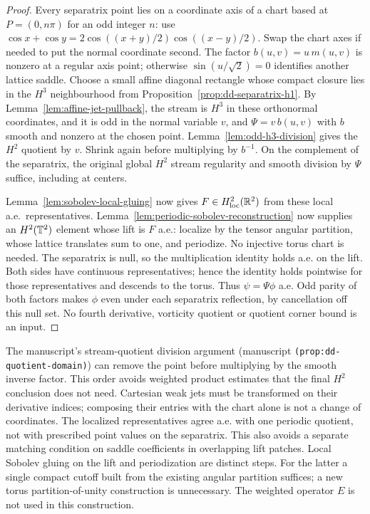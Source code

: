 \begin{proof}
Every separatrix point lies on a coordinate axis of a chart based at
$P=(0,n\pi)$ for an odd integer $n$: use
$\cos x+\cos y=2\cos((x+y)/2)\cos((x-y)/2)$.
Swap the chart axes if needed to put the normal coordinate second.
The factor $b(u,v)=u\,m(u,v)$ is nonzero at a regular axis point;
otherwise $\sin(u/\sqrt2)=0$ identifies another lattice saddle.
Choose a small affine diagonal rectangle whose compact closure lies
in the $H^3$ neighbourhood from
Proposition~\ref{prop:dd-separatrix-h1}.
By Lemma~\ref{lem:affine-jet-pullback}, the stream is $H^3$ in these
orthonormal coordinates, and it is odd in the normal variable
$v$, and $\Psi=v\,b(u,v)$ with $b$ smooth and nonzero at the chosen point.
Lemma~\ref{lem:odd-h3-division} gives the $H^2$ quotient by $v$.
Shrink again before multiplying by $b^{-1}$.
On the complement of the separatrix, the original global $H^2$ stream
regularity and smooth division by $\Psi$ suffice, including at centers.

Lemma~\ref{lem:sobolev-local-gluing} now gives
$F\in H^2_{\mathrm{loc}}(\mathbb{R}^2)$ from these local a.e.\ representatives.
Lemma~\ref{lem:periodic-sobolev-reconstruction} now supplies an
$H^2(\mathbb{T}^2)$ element whose lift is $F$ a.e.: localize by the tensor angular
partition, whose lattice translates sum to one, and periodize.
No injective torus chart is needed.
The separatrix is null, so the multiplication identity holds a.e. on the
lift. Both sides have continuous representatives; hence the identity holds
pointwise for those representatives and descends to the torus.
Thus $\psi=\Psi\phi$ a.e. Odd parity of both factors makes $\phi$ even under
each separatrix reflection, by cancellation off this null set.
No fourth derivative, vorticity quotient or quotient corner bound is an input.
\end{proof}

\begin{remark}
The manuscript's stream-quotient division argument
(manuscript \texttt{(prop:dd-quotient-domain)}) can remove the point
before multiplying by the smooth inverse factor. This order avoids
weighted product estimates that the final $H^2$ conclusion does not need.
Cartesian weak jets must be transformed on their derivative indices;
composing their entries with the chart alone is not a change of coordinates.
The localized representatives agree a.e. with one periodic quotient, not
with prescribed point values on the separatrix. This also avoids a separate
matching condition on saddle coefficients in overlapping lift patches.
Local Sobolev gluing on the lift and periodization are distinct steps.
For the latter a single compact cutoff built from the existing angular
partition suffices; a new torus partition-of-unity construction is unnecessary.
The weighted operator $E$ is not used in this construction.
\end{remark}


